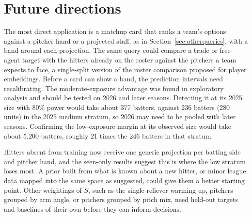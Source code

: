 \section{Future directions}
\label{sec:future}

The most direct application is a matchup card that ranks a team's options against a pitcher hand or a projected staff, as in Section~\ref{sec:otherqueries}, with a band around each projection. The same query could compare a trade or free-agent target with the hitters already on the roster against the pitchers a team expects to face, a single-split version of the roster comparison \citet{alcorn2018} proposed for player embeddings. Before a card can show a band, the prediction intervals need recalibrating. The moderate-exposure advantage was found in exploratory analysis and should be tested on 2026 and later seasons. Detecting it at its 2025 size with 80\% power would take about 377 batters, against 236 batters (280 units) in the 2025 medium stratum, so 2026 may need to be pooled with later seasons. Confirming the low-exposure margin at its observed size would take about 5,200 batters, roughly 21 times the 246 batters in that stratum.

Hitters absent from training now receive one generic projection per batting side and pitcher hand, and the seen-only results suggest this is where the low stratum loses most. A prior built from what is known about a new hitter, or minor league data mapped into the same space as \citet{alcorn2018} suggested, could give them a better starting point. Other weightings of $S$, such as the single reliever warming up, pitchers grouped by arm angle, or pitchers grouped by pitch mix, need held-out targets and baselines of their own before they can inform decisions.





